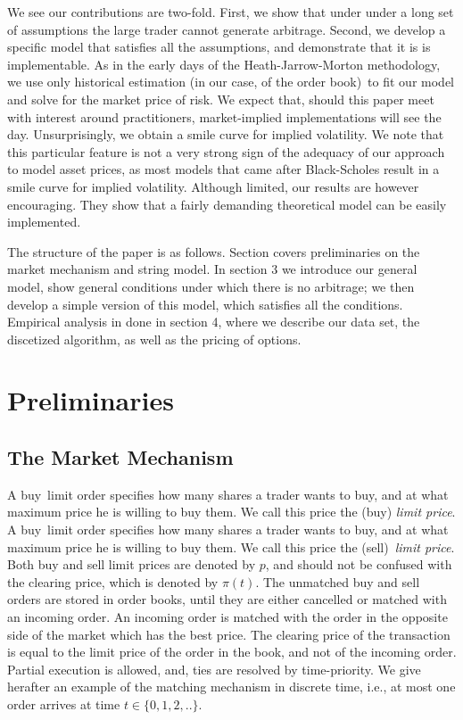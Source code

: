 \documentclass{article}
\begin{document}
We see our contributions are two-fold. First, we show that under under a
long set of assumptions the large trader cannot generate arbitrage. Second,
we develop a specific model that satisfies all the assumptions, and
demonstrate that it is is implementable. As in the early days of the
Heath-Jarrow-Morton methodology, we use only historical estimation (in our
case, of the order book)\ to fit our model and solve for the market price of
risk. We expect that, should this paper meet with interest around
practitioners, market-implied implementations will see the day.
Unsurprisingly, we obtain a smile curve for implied volatility. We note that
this particular feature is not a very strong sign of the adequacy of our
approach to model asset prices, as most models that came after Black-Scholes \cite{BS73} result in a smile curve for implied volatility. Although limited,
our results are however encouraging. They show that a fairly demanding
theoretical model can be easily implemented.

The structure of the paper is as follows. Section covers preliminaries on
the market mechanism and string model. In section 3 we introduce our general
model, show general conditions under which there is no arbitrage; we then
develop a simple version of this model, which satisfies all the conditions.
Empirical analysis in done in section 4, where we describe our data set, the
discetized algorithm, as well as the pricing of options.

\section{Preliminaries}

\subsection{The Market Mechanism}

\noindent A buy\ limit order specifies how many shares a trader wants to
buy, and at what maximum price he is willing to buy them. We call this price
the (buy) \textit{limit price}. A buy\ limit order specifies how many shares
a trader wants to buy, and at what maximum price he is willing to buy them.
We call this price the (sell)\ \textit{limit price}. Both buy and sell limit
prices are denoted by $p$, and should not be confused with the clearing
price, which is denoted by $\pi (t)$. The unmatched buy and sell orders are
stored in order books, until they are either cancelled or matched with an
incoming order. An incoming order is matched with the order in the opposite
side of the market which has the best price. The clearing price of the
transaction is equal to the limit price of the order in the book, and not of
the incoming order. Partial execution is allowed, and, ties are resolved by
time-priority. We give herafter an example of the matching mechanism in
discrete time, i.e., at most one order arrives at time $t\in \{0,1,2,..\}.$
\end{document}
